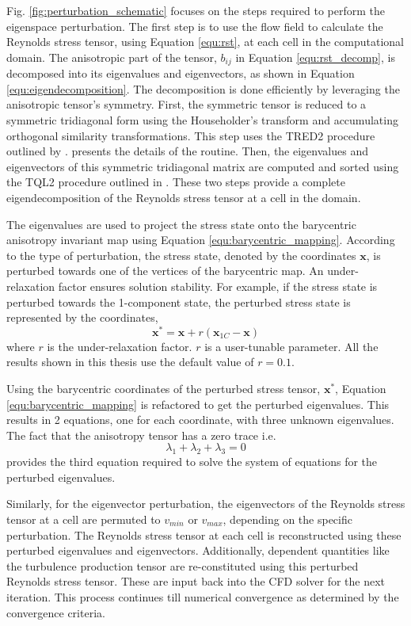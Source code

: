 Fig. \ref{fig:perturbation_schematic} focuses on the steps required to perform the eigenspace perturbation.
The first step is to use the flow field to calculate the Reynolds stress tensor, using Equation \ref{equ:rst}, at each cell in the computational domain.
The anisotropic part of the tensor, $b_{ij}$ in Equation \ref{equ:rst_decomp}, is decomposed into its eigenvalues and eigenvectors, as shown in Equation \ref{equ:eigendecomposition}.
The decomposition is done efficiently by leveraging the anisotropic tensor's symmetry.
First, the symmetric tensor is reduced to a symmetric tridiagonal form using the Householder's transform and accumulating orthogonal similarity transformations.
This step uses the TRED2 procedure outlined by \cite{tred2a}.
\cite{numres} presents the details of the routine.
Then, the eigenvalues and eigenvectors of this symmetric tridiagonal matrix are computed and sorted using the TQL2 procedure outlined in \cite{tred2b}.
These two steps provide a complete eigendecomposition of the Reynolds stress tensor at a cell in the domain.

The eigenvalues are used to project the stress state onto the barycentric anisotropy invariant map using Equation \ref{equ:barycentric_mapping}.
According to the type of perturbation, the stress state, denoted by the coordinates $\mathbf{x}$, is perturbed towards one of the vertices of the barycentric map.
An under-relaxation factor ensures solution stability.
For example, if the stress state is perturbed towards the 1-component state, the perturbed stress state is represented by the coordinates, 
\begin{equation}
    \mathbf{x^*} = \mathbf{x} + r\left ( \mathbf{x}_{1C} - \mathbf{x} \right )
\end{equation}
where $r$ is the under-relaxation factor.
$r$ is a user-tunable parameter. 
All the results shown in this thesis use the default value of $r=0.1$.

Using the barycentric coordinates of the perturbed stress tensor, $\mathbf{x^*}$, Equation \ref{equ:barycentric_mapping} is refactored to get the perturbed eigenvalues.
This results in 2 equations, one for each coordinate, with three unknown eigenvalues.
The fact that the anisotropy tensor has a zero trace i.e. 
\begin{equation}
    \lambda_1 + \lambda_2 + \lambda_3 = 0
\end{equation}
provides the third equation required to solve the system of equations for the perturbed eigenvalues.

Similarly, for the eigenvector perturbation, the eigenvectors of the Reynolds stress tensor at a cell are permuted to $v_{min}$ or $v_{max}$, depending on the specific perturbation.
The Reynolds stress tensor at each cell is reconstructed using these perturbed eigenvalues and eigenvectors.
Additionally, dependent quantities like the turbulence production tensor are re-constituted using this perturbed Reynolds stress tensor.
These are input back into the CFD solver for the next iteration.
This process continues till numerical convergence as determined by the convergence criteria. 

